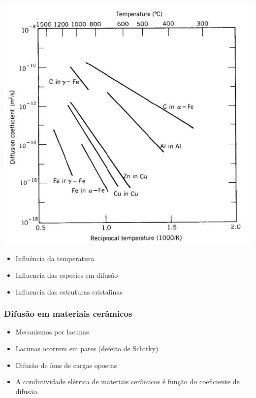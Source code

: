 \includegraphics[scale=0.4,trim={0 0 0 0}]{figures/difTemp}

\begin{itemize}
	\item Influência da temperatura
	\item Influencia das especies em difusão
	\item Influencia das estruturas cristalinas 
\end{itemize}





\subsubsection{Difusão em materiais cerâmicos}


\begin{itemize}
	\item Mecanismos por lacunas
	\item Lacunas ocorrem em pares (defeito de Schttky)
	\item Difusão de íons de cargas opostas
	\item A condutividade elétrica de materiais cerâmicos é função do coeficiente de difusão.
\end{itemize}



